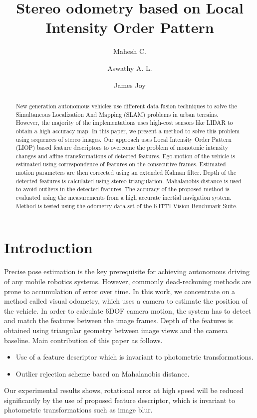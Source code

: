 \documentclass{article}
\title{Stereo odometry based on  Local Intensity Order Pattern}
\author[1]{Mahesh C.}
\author[1]{Aswathy A. L.}
\author[2]{James Joy}
\affil[1]{Department of Computer Science, University of Kerala, Kariavattom, Thiruvananthapuram-695581,Kerala, India}
\affil[2]{Tata Elxsi Limited, Technopark Campus, Kariavattom, Thiruvananthapuram-695581,Kerala, India}
\date{}
\begin{document}
\maketitle
\begin{abstract}
New generation autonomous vehicles use different data fusion techniques to solve the Simultaneous Localization And Mapping (SLAM) problems in urban terrains.  However, the majority of the implementations uses high-cost sensors like LIDAR to obtain a high accuracy map. In this paper, we  present a method  to solve this problem using sequences of stereo images. Our approach uses Local Intensity Order Pattern (LIOP) based  feature descriptors to  overcome the problem of monotonic intensity changes and affine transformations of detected features. Ego-motion of the vehicle is estimated using correspondence of features on the consecutive frames. Estimated motion parameters are then corrected using an extended Kalman filter. Depth of the detected features is calculated using stereo triangulation. Mahalanobis distance  is used to avoid outliers in the detected features.
The accuracy of  the proposed method is  evaluated using the measurements from a  high accurate inertial navigation system. Method is tested using the odometry data set of the KITTI Vision Benchmark Suite.
			
\end{abstract}
\section{Introduction}

 Precise  pose estimation is  the key prerequisite for  achieving autonomous driving of any mobile robotics systems. However, commonly dead-reckoning methods are prone to accumulation of error over time. In this work, we concentrate on a method called visual odometry, which uses a  camera to estimate the position of the vehicle. In order to calculate 6DOF camera motion, the system has to detect and match the features between the image frames. Depth of the features is obtained using triangular geometry between  image views and the camera baseline. Main contribution of this paper  as follows.

\begin{itemize}
\item Use of a feature descriptor which is invariant to photometric transformations.
\item Outlier rejection scheme based on Mahalanobis distance.
\end{itemize}
\par
Our experimental results shows, rotational error at high speed will be reduced significantly by the use of  proposed feature descriptor, which is invariant to  photometric transformations such as image blur. 
\end{document}
